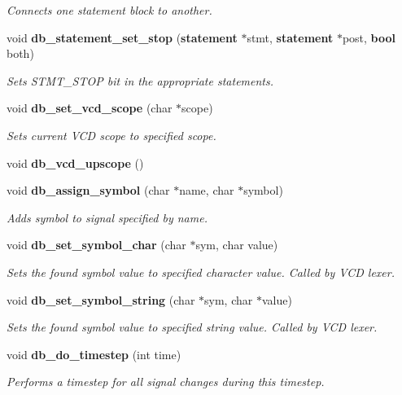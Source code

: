 \begin{CompactItemize}
\begin{CompactList}\small\item\em Connects one statement block to another.\item\end{CompactList}\item 
void {\bf db\_\-statement\_\-set\_\-stop} ({\bf statement} $\ast$stmt, {\bf statement} $\ast$post, {\bf bool} both)
\begin{CompactList}\small\item\em Sets STMT\_\-STOP bit in the appropriate statements.\item\end{CompactList}\item 
void {\bf db\_\-set\_\-vcd\_\-scope} (char $\ast$scope)
\begin{CompactList}\small\item\em Sets current VCD scope to specified scope.\item\end{CompactList}\item 
void {\bf db\_\-vcd\_\-upscope} ()
\item 
void {\bf db\_\-assign\_\-symbol} (char $\ast$name, char $\ast$symbol)
\begin{CompactList}\small\item\em Adds symbol to signal specified by name.\item\end{CompactList}\item 
void {\bf db\_\-set\_\-symbol\_\-char} (char $\ast$sym, char value)
\begin{CompactList}\small\item\em Sets the found symbol value to specified character value. Called by VCD lexer.\item\end{CompactList}\item 
void {\bf db\_\-set\_\-symbol\_\-string} (char $\ast$sym, char $\ast$value)
\begin{CompactList}\small\item\em Sets the found symbol value to specified string value. Called by VCD lexer.\item\end{CompactList}\item 
void {\bf db\_\-do\_\-timestep} (int time)
\begin{CompactList}\small\item\em Performs a timestep for all signal changes during this timestep.\item\end{CompactList}\end{CompactItemize}
